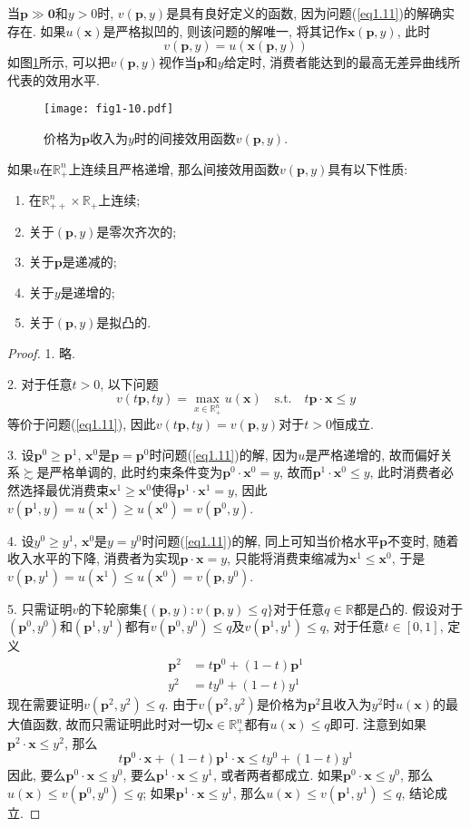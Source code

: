 \documentclass[cn, 12pt, math=mtpro2, bibstyle=apa, blue, twocol]{elegantbook}
\newcommand{\R}{\mathbb{R}}
\newcommand{\p}{\mathbf{p}}
\newcommand{\x}{\mathbf{x}}
\begin{document}
当$\p\gg\mathbf{0}$和$y>0$时, $v(\p,y)$是具有良好定义的函数, 因为问题(\ref{eq1.11})的解确实存在. 如果$u(\x)$是严格拟凹的, 则该问题的解唯一, 将其记作$\x(\p,y)$, 此时
$$v(\p,y)=u(\x(\p,y))$$
如图\ref{fig1.10}所示, 可以把$v(\p,y)$视作当$\p$和$y$给定时, 消费者能达到的最高无差异曲线所代表的效用水平.
\begin{figure}[htbp!]
  \centering
  \texttt{[image: fig1-10.pdf]}
  \caption{价格为$\p$收入为$y$时的间接效用函数$v(\p,y)$.}\label{fig1.10}
\end{figure}
\begin{theorem}[间接效用函数的性质]
  如果$u$在$\R_+^n$上连续且严格递增, 那么间接效用函数$v(\p,y)$具有以下性质:
  \begin{enumerate}[label=\arabic*.]
    \item 在$\R_{++}^n\times\R_+$上连续;
    \item 关于$(\p,y)$是零次齐次的;
    \item 关于$\p$是递减的;
    \item 关于$y$是递增的;
    \item 关于$(\p,y)$是拟凸的.
  \end{enumerate}
\end{theorem}
\begin{proof}
  1. 略.

  2. 对于任意$t>0$, 以下问题
  $$v(t\p,ty)=\max_{x\in\R_+^n}u(\x)\quad\text{s.t.}\quad t\p\cdot\x\leq y$$
  等价于问题(\ref{eq1.11}), 因此$v(t\p,ty)=v(\p,y)$对于$t>0$恒成立.

  3. 设$\p^0\ge\p^1$, $\x^0$是$\p=\p^0$时问题(\ref{eq1.11})的解, 因为$u$是严格递增的, 故而偏好关系$\succsim$是严格单调的, 此时约束条件变为$\p^0\cdot\x^0=y$, 故而$\p^1\cdot\x^0\leq y$, 此时消费者必然选择最优消费束$\x^1\ge \x^0$使得$\p^1\cdot\x^1=y$, 因此$v(\p^1,y)=u(\x^1)\geq u(\x^0)=v(\p^0,y)$.

  4. 设$y^0\ge y^1$, $\x^0$是$y=y^0$时问题(\ref{eq1.11})的解, 同上可知当价格水平$\p$不变时, 随着收入水平的下降, 消费者为实现$\p\cdot\x=y$, 只能将消费束缩减为$\x^1\leq \x^0$, 于是$v(\p,y^1)=u(\x^1)\leq u(\x^0)=v(\p,y^0)$.

  5. 只需证明$v$的下轮廓集$\{(\p,y):v(\p,y)\leq q\}$对于任意$q\in\R$都是凸的. 假设对于$(\p^0,y^0)$和$(\p^1,y^1)$都有$v(\p^0,y^0)\leq q$及$v(\p^1,y^1)\leq q$, 对于任意$t\in[0,1]$, 定义
  \begin{align*}
  \p^2&=t\p^0+(1-t)\p^1 \\
  y^2&=ty^0+(1-t)y^1
  \end{align*}
  现在需要证明$v(\p^2,y^2)\leq q$. 由于$v(\p^2,y^2)$是价格为$\p^2$且收入为$y^2$时$u(\x)$的最大值函数, 故而只需证明此时对一切$\x\in\R_+^n$都有$u(\x)\leq q$即可. 注意到如果$\p^2\cdot\x\leq y^2$, 那么
  $$t\p^0\cdot\x+(1-t)\p^1\cdot\x\leq ty^0+(1-t)y^1$$
  因此, 要么$\p^0\cdot \x\leq y^0$, 要么$\p^1\cdot\x\leq y^1$, 或者两者都成立. 如果$\p^0\cdot \x\leq y^0$, 那么$u(\x)\leq v(\p^0,y^0)\leq q$; 如果$\p^1\cdot\x\leq y^1$, 那么$u(\x)\leq v(\p^1,y^1)\leq q$, 结论成立.

\end{proof}
\end{document}
